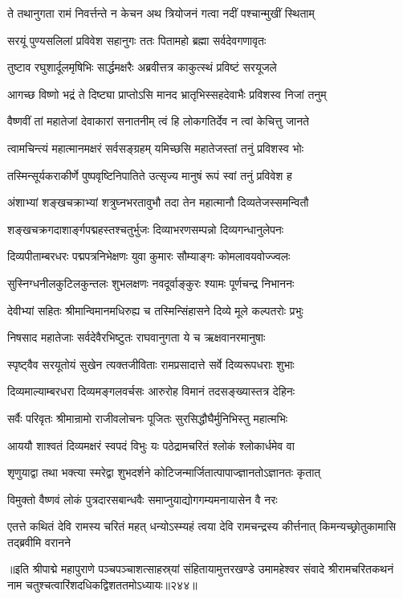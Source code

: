 \twolineshloka
{ते तथानुगता रामं निवर्त्तन्ते न केचन}
{अथ त्रियोजनं गत्वा नदीं पश्चान्मुखीं स्थिताम्}%

\twolineshloka
{सरयूं पुण्यसलिलां प्रविवेश सहानुगः}
{ततः पितामहो ब्रह्मा सर्वदेवगणावृतः}%

\twolineshloka
{तुष्टाव रघुशार्दूलमृषिभिः सार्द्धमक्षरैः}
{अब्रवीत्तत्र काकुत्स्थं प्रविष्टं सरयूजले}%


\twolineshloka
{आगच्छ विष्णो भद्रं ते दिष्ट्या प्राप्तोऽसि मानद}
{भ्रातृभिस्सहदेवाभैः प्रविशस्व निजां तनुम्}%

\twolineshloka
{वैष्णवीं तां महातेजां देवाकारां सनातनीम्}
{त्वं हि लोकगतिर्देव न त्वां केचित्तु जानते}%

\twolineshloka
{त्वामचिन्त्यं महात्मानमक्षरं सर्वसङ्ग्रहम्}
{यमिच्छसि महातेजस्तां तनुं प्रविशस्व भोः}%


\twolineshloka
{तस्मिन्सूर्यकराकीर्णे पुष्पवृष्टिनिपातिते}
{उत्सृज्य मानुषं रूपं स्वां तनुं प्रविवेश ह}%

\twolineshloka
{अंशाभ्यां शङ्खचक्राभ्यां शत्रुघ्नभरतावुभौ}
{तदा तेन महात्मानौ दिव्यतेजस्समन्वितौ}%

\twolineshloka
{शङ्खचक्रगदाशार्ङ्गपद्महस्तश्चतुर्भुजः}
{दिव्याभरणसम्पन्नो दिव्यगन्धानुलेपनः}%

\twolineshloka
{दिव्यपीताम्बरधरः पद्मपत्रनिभेक्षणः}
{युवा कुमारः सौम्याङ्गः कोमलावयवोज्ज्वलः}%

\twolineshloka
{सुस्निग्धनीलकुटिलकुन्तलः शुभलक्षणः}
{नवदूर्वाङ्कुरः श्यामः पूर्णचन्द्र निभाननः}%

\twolineshloka
{देवीभ्यां सहितः श्रीमान्विमानमधिरुह्य च}
{तस्मिन्सिंहासने दिव्ये मूले कल्पतरोः प्रभुः}%

\twolineshloka
{निषसाद महातेजाः सर्वदेवैरभिष्टुतः}
{राघवानुगता ये च ऋक्षवानरमानुषाः}%

\twolineshloka
{स्पृष्ट्वैव सरयूतोयं सुखेन त्यक्तजीविताः}
{रामप्रसादात्ते सर्वे दिव्यरूपधराः शुभाः}%

\twolineshloka
{दिव्यमाल्याम्बरधरा दिव्यमङ्गलवर्चसः}
{आरुरोह विमानं तदसङ्ख्यास्तत्र देहिनः}%

\twolineshloka
{सर्वैः परिवृतः श्रीमान्रामो राजीवलोचनः}
{पूजितः सुरसिद्धौघैर्मुनिभिस्तु महात्मभिः}%

\twolineshloka
{आययौ शाश्वतं दिव्यमक्षरं स्वपदं विभुः}
{यः पठेद्रामचरितं श्लोकं श्लोकार्धमेव वा}%

\twolineshloka
{शृणुयाद्वा तथा भक्त्या स्मरेद्वा शुभदर्शने}
{कोटिजन्मार्जितात्पापाज्ज्ञानतोऽज्ञानतः कृतात्}%

\twolineshloka
{विमुक्तो वैष्णवं लोकं पुत्रदारसबान्धवैः}
{समाप्नुयाद्योगगम्यमनायासेन वै नरः}%


\onelineshloka
{एतत्ते कथितं देवि रामस्य चरितं महत्}
{धन्योऽस्म्यहं त्वया देवि रामचन्द्रस्य कीर्त्तनात्}
{किमन्यच्छ्रोतुकामासि तद्ब्रवीमि वरानने}%

{॥इति श्रीपाद्मे महापुराणे पञ्चपञ्चाशत्साहस्र्यां संहितायामुत्तरखण्डे उमामहेश्वर संवादे श्रीरामचरितकथनं नाम चतुश्चत्वारिंशदधिकद्विशततमोऽध्यायः॥२४४॥}


